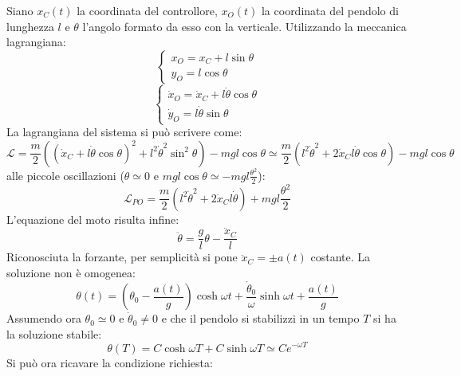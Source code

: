 \documentclass[12pt, a4paper]{book}
\theoremstyle{theorem}
\begin{document}
				Siano $x_{C}(t)$ la coordinata del controllore, $x_{O}(t)$ la coordinata del pendolo di lunghezza $l$ e $\theta$ l'angolo formato da esso con la verticale.
				Utilizzando la meccanica lagrangiana:
				\begin{equation}
					\begin{cases}
						x_{O}=x_{C}+l\sin\theta\\
						y_{O}=l\cos\theta
					\end{cases}
				\end{equation}
				\begin{equation}
					\begin{cases}
						\dot{x}_O=\dot{x}_{C}+l\dot{\theta}\cos\theta\\
						\dot{y}_{O}=l\dot{\theta}\sin\theta
					\end{cases}
				\end{equation}
				La lagrangiana del sistema si può scrivere come:
				\begin{equation}
					\mathcal{L}=\frac{m}{2}\left( \left( \dot{x}_{C}+l\dot{\theta}\cos\theta \right)^2 + l^2\dot{\theta}^2\sin^2\theta \right) - mgl\cos\theta \simeq \frac{m}{2}\left( l^2\dot{\theta}^2 + 2\dot{x}_{C}l\dot{\theta}\cos\theta \right) - mgl\cos\theta
				\end{equation}
				alle piccole oscillazioni ($\theta\simeq 0$ e $mgl\cos\theta\simeq -mgl\frac{\theta^2}{2}$):
				\begin{equation}
					\mathcal{L}_{PO}=\frac{m}{2}\left( l^2\dot{\theta}^2 + 2\dot{x}_{C}l\dot{\theta} \right) + mgl\frac{\theta^2}{2}
				\end{equation}
				L'equazione del moto risulta infine:
				\begin{equation}
					\ddot{\theta}=\frac{g}{l}\theta - \frac{\ddot{x}_C}{l}
				\end{equation}
				Riconosciuta la forzante, per semplicità si pone $\ddot{x}_C=\pm a(t)$ costante.
				La soluzione non è omogenea:
				\begin{equation}
					\theta(t)=\left( \theta_{0} -\frac{a(t)}{g} \right)\cosh\omega t + \frac{\dot{\theta}_0}{\omega}\sinh\omega t +\frac{a(t)}{g}
				\end{equation}
				Assumendo ora $\theta_0\simeq 0$ e $\dot{\theta}_0\neq 0$ e che il pendolo si stabilizzi in un tempo $T$ si ha la soluzione stabile:
				\begin{equation}
					\theta(T)=C\cosh\omega T + C\sinh\omega T \simeq Ce^{-\omega T}
				\end{equation}
				Si può ora ricavare la condizione richiesta:
\end{document}
